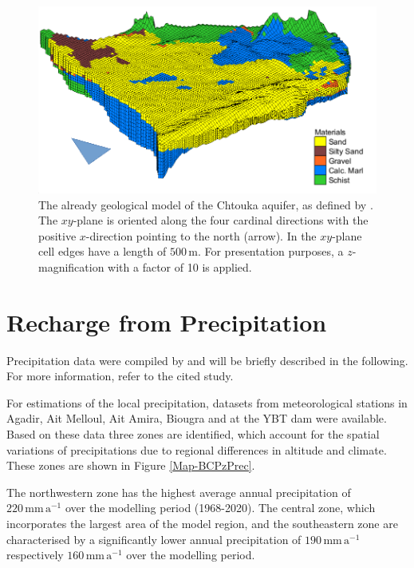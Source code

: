 \begin{figure}[h]
    \centering
    \includegraphics{./img/Fig-GeoMod.pdf}
    \caption{The already geological model of the Chtouka aquifer, as defined by \cite{Horn.2021}. The $xy$-plane is oriented along the four cardinal directions with the positive $x$-direction pointing to the north (arrow). In the $xy$-plane cell edges have a length of $500 \, \textrm{m}$. For presentation purposes, a $z$-magnification with a factor of 10 is applied.}
    \label{Fig-GeolMod}
\end{figure}


\section{Recharge from Precipitation}
\label{Sec-PrecRech}

Precipitation data were compiled by \cite{Horn.2021} and will be briefly described in the following. For more information, refer to the cited study.
    
For estimations of the local precipitation, datasets from meteorological stations in Agadir, Ait Melloul, Ait Amira, Biougra and at the YBT dam were available. Based on these data three zones are identified, which account for the spatial variations of precipitations due to regional differences in altitude and climate. These zones are shown in Figure \ref{Map-BCPzPrec}.
    
    
The northwestern zone has the highest average annual precipitation of \linebreak $220 \, \textrm{mm} \, \textrm{a}^{-1}$ over the modelling period (1968-2020). The central zone, which incorporates the largest area of the model region, and the southeastern zone are characterised by a significantly lower annual precipitation of $190 \, \textrm{mm} \, \textrm{a}^{-1}$ respectively $160 \, \textrm{mm} \, \textrm{a}^{-1}$ over the modelling period.

